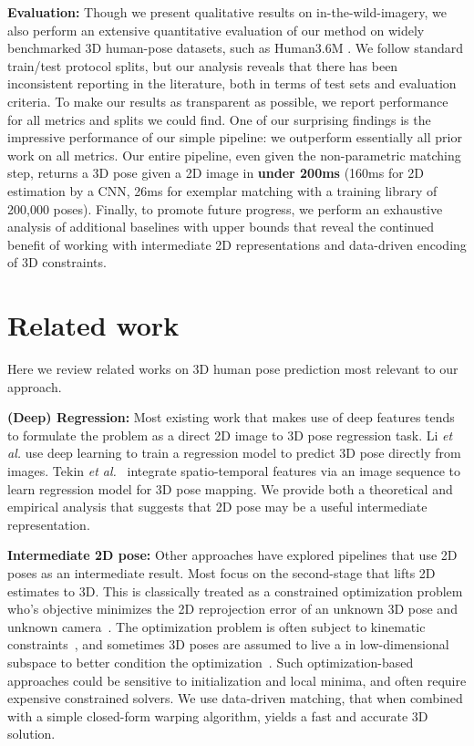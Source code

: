 \documentclass[10pt,twocolumn,letterpaper]{article}
\begin{document}
{\bf Evaluation:} Though we present qualitative results on in-the-wild-imagery, we also perform an extensive quantitative evaluation of our method on widely benchmarked 3D human-pose datasets, such as Human3.6M \cite{h36m_pami}. We follow standard train/test protocol splits, but our analysis reveals that there has been inconsistent reporting in the literature, both in terms of test sets and evaluation criteria. To make our results as transparent as possible, we report performance for all metrics and splits we could find. One of our surprising findings is the impressive performance of our simple pipeline: we outperform essentially all prior work on all metrics. Our entire pipeline, even given the non-parametric matching step, returns a 3D pose given a 2D image in {\bf under 200ms} (160ms for 2D estimation by a CNN, 26ms for exemplar matching with a training library of  200,000 poses). Finally, to promote future progress, we perform an exhaustive analysis of additional baselines with upper bounds that reveal the continued benefit of working with intermediate 2D representations and data-driven encoding of 3D constraints.






\section{Related work}
Here we review related works on 3D human pose prediction most relevant to our approach.


\textbf{(Deep) Regression:} Most existing work that makes use of deep features tends to formulate the problem as a direct 2D image to 3D pose regression task. Li \textit{et al.} \cite{li20143d} use deep learning to train a regression model to predict 3D pose directly from images. Tekin \textit{et al.}~\cite{Tekin_2016_CVPR} integrate spatio-temporal features via an image sequence to learn regression model for 3D pose mapping. We provide both a theoretical and empirical analysis that suggests that 2D pose may be a useful intermediate representation.

\textbf{Intermediate 2D pose:} Other approaches have explored pipelines that use 2D poses as an intermediate result. Most focus on the second-stage that lifts 2D estimates to 3D.  This is classically treated as a constrained optimization problem who's objective minimizes the 2D reprojection error of an unknown 3D pose and unknown camera~\cite{Zhou_2016_CVPR,wang2014robust,ramakrishna2012reconstructing,akhter2015pose}. The optimization problem is often subject to kinematic constraints~\cite{wei2009modeling,simo2012single}, and sometimes 3D poses are assumed to live a in low-dimensional subspace to better condition the optimization~\cite{Zhou_2016_CVPR}. Such optimization-based approaches could be sensitive to initialization and local minima, and often require expensive constrained solvers. We use data-driven matching, that when combined with a simple closed-form warping algorithm, yields a fast and accurate 3D solution. 
\end{document}
